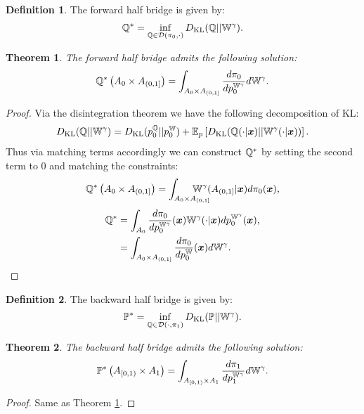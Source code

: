 \documentclass[a4paper,12pt,twoside,openright]{report}
\newtheorem{theorem}{Theorem}
\theoremstyle{definition}
\newtheorem{definition}{Definition}[section]
\begin{document}
\begin{definition}
The forward half bridge is given by:
    \begin{align}
        {{\mathbb{Q}}}^{*} = \inf_{{\mathbb{Q}}  \in {\mathcal{D}}(\pi_0, \cdot)} D_{\mathrm{KL}} ({\mathbb{Q}} || \mathbb{W}^\gamma) .
    \end{align}
\end{definition}
\begin{theorem}\label{thrm:half_bridge_forward}
    The forward half bridge admits the following solution: 
\begin{align}
    {{\mathbb{Q}}}^{*}\left(A_0 \times A_{(0,1]}\right) =  \int_{A_0\times A_{(0,1]}} \frac{d \pi_0}{ dp_0^{\mathbb{W}^\gamma}} d\mathbb{W}^\gamma.
\end{align}
\end{theorem}
\begin{proof}
Via the disintegration theorem we have the following decomposition of KL:
\begin{align}
    D_{\mathrm{KL}}({\mathbb{Q}} || \mathbb{W}^\gamma) = D_{\mathrm{KL}}(p_0^{\mathbb{Q}}|| p_0^{\mathbb{W}} )  + \mathbb{E}_p\left[D_{\mathrm{KL}}({\mathbb{Q}}(\cdot| {\bm{x}}) || \mathbb{W}^\gamma(\cdot | {\bm{x}}))\right]. \nonumber
\end{align}
Thus via matching terms accordingly we can construct ${\mathbb{Q}}^*$ by setting the second term to $0$ and matching the constraints:
\begin{align}
    {\Q}^{*}\left(A_0 \times A_{(0,1]}\right) = \int_{A_0 \times A_{(0,1]}}\!\!\!\!\!\!\!\!\!\!\!\!\W^\gamma(A_{(0,1]} | \vx) d\pi_0(\vx),
\end{align}
\begin{align}
    {{\mathbb{Q}}}^{*} &= \int_{A_0}  \frac{d\pi_0}{dp_0^{\mathbb{W}^\gamma}}({\bm{x}})   \mathbb{W}^\gamma(\cdot | {\bm{x}}) d p_0^{\mathbb{W}^{\gamma}}({\bm{x}}) , \nonumber \\
    &= \int_{A_0 \times A_{(0,1]} }  \frac{d\pi_0}{dp_0^{\mathbb{W}}}({\bm{x}})  d \mathbb{W}^{\gamma}.
\end{align}
\end{proof}
\begin{definition}
The backward half bridge is given by:
    \begin{align}
        {{\mathbb{P}}}^{*} = \inf_{{\mathbb{Q}}  \in {\mathcal{D}}(\cdot, \pi_1)} D_{\mathrm{KL}} ({\mathbb{P}} || \mathbb{W}^\gamma) .
    \end{align}
\end{definition}
\begin{theorem}\label{thrm:half_bridge_backward}
     The backward half bridge admits the following solution: 
\begin{align}
    {{\mathbb{P}}}^{*}\left( A_{[0,1)} \times A_1\right) =  \int_{ A_{[0,1)} \times A_1}  \frac{d \pi_1}{ d p_1^{\mathbb{W}^\gamma} } d\mathbb{W}^\gamma.
\end{align}

\end{theorem}
\begin{proof}
Same as Theorem \ref{thrm:half_bridge_forward}.
\end{proof}
\end{document}

